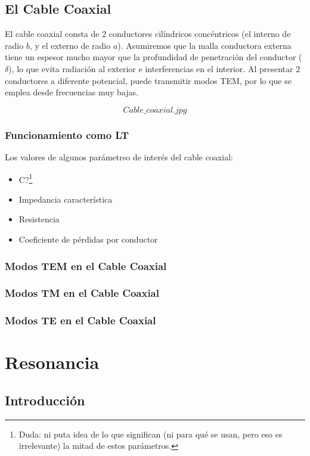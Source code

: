 \documentclass[12pt]{article}
\begin{document}
\subsection{El Cable Coaxial}

El cable coaxial consta de 2 conductores cil\'indricos conc\'entricos (el interno de radio $b$, y el externo de radio $a$). Asumiremos que la malla conductora externa tiene un espesor mucho mayor que la profundidad de penetraci\'on del conductor ($\delta$), lo que evita radiaci\'on al exterior e interferencias en el interior. Al presentar 2 conductores a diferente potencial, puede transmitir modos TEM, por lo que se emplea desde frecuencias muy bajas.

$$
	Cable\_coaxial.jpg
$$

\subsubsection{Funcionamiento como LT}
Los valores de algunos par\'ametrso de inter\'es del cable coaxial:
\begin{itemize}
	\item C?\footnote{Duda: ni puta idea de lo que significan (ni para qu\'e se usan, pero eso es irrelevante) la mitad de estos par\'ametros.}
	\item Impedancia caracter\'istica
	\item Resistencia
	\item Coeficiente de p\'erdidas por conductor
\end{itemize}

\subsubsection{Modos TEM en el Cable Coaxial}

\subsubsection{Modos TM en el Cable Coaxial}

\subsubsection{Modos TE en el Cable Coaxial}

\section{Resonancia}

\subsection{Introducci\'on}
\end{document}

